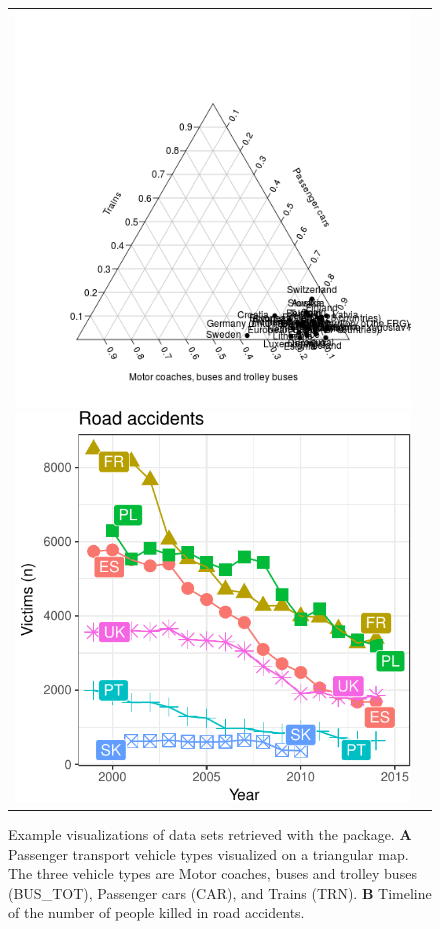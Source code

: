\begin{figure}
\begin{center}
\begin{tabular}{cc}
\includegraphics{2015-manu-search2-1}
\includegraphics{2015-manu-roadacc-1}
\end{tabular}
\end{center}
\caption{Example visualizations of data sets retrieved with the  package. {\bf A} Passenger transport vehicle types visualized on a triangular  map. The three vehicle types are Motor coaches, buses and trolley buses (BUS\_TOT), Passenger cars (CAR), and Trains (TRN). {\bf B} Timeline of the number of people killed in road accidents.}
\label{fig:transport}
\end{figure}


